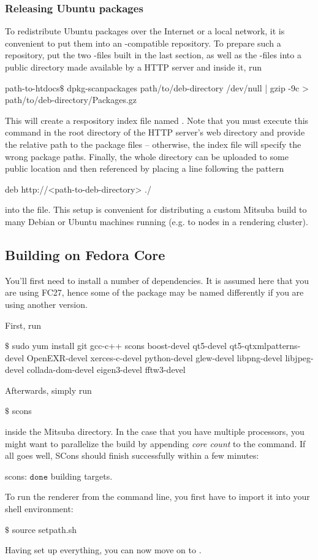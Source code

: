 \subsubsection{Releasing Ubuntu packages}
To redistribute Ubuntu packages over the Internet or a local network, it is convenient to
put them into an -compatible repository. To prepare such a
repository, put the two -files built in the last section,
as well as the  -files into a public directory
made available by a HTTP server and inside it, run
\begin{shell}
path-to-htdocs$\text{\$}$ dpkg-scanpackages path/to/deb-directory /dev/null | gzip -9c > path/to/deb-directory/Packages.gz
\end{shell}
This will create a respository index file named .
Note that you must execute this command in the root directory of the
HTTP server's web directory and provide the relative path to the
package files -- otherwise, the index file will specify the wrong package
paths. Finally, the whole directory can be uploaded to some public location
and then referenced by placing a line following the pattern
\begin{shell}
deb http://<path-to-deb-directory> ./
\end{shell}
into the  file. This setup is convenient for
distributing a custom Mitsuba build to many Debian or Ubuntu machines running (e.g. to nodes in a rendering cluster).
\subsection{Building on Fedora Core}
You'll first need to install a number of dependencies. It is assumed here
that you are using FC27, hence some of the package may be named differently if you are
using another version.

First, run
\begin{shell}
$\text{\$}$ sudo yum install git gcc-c++ scons boost-devel qt5-devel qt5-qtxmlpatterns-devel OpenEXR-devel xerces-c-devel python-devel glew-devel libpng-devel libjpeg-devel collada-dom-devel eigen3-devel fftw3-devel
\end{shell}
Afterwards, simply run
\begin{shell}
$\text{\$}$ scons
\end{shell}
inside the Mitsuba directory. In the case that you have multiple processors, you might want to parallelize the build by appending \emph{core count} to the command.
If all goes well, SCons should finish successfully within a few minutes:
\begin{shell}
scons: $\texttt{done}$ building targets.
\end{shell}
To run the renderer from the command line, you first have to import it into your shell environment:
\begin{shell}
$\text{\$}$ source setpath.sh
\end{shell}
Having set up everything, you can now move on to .
